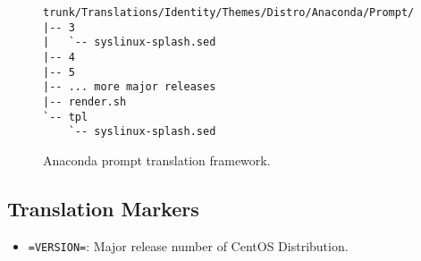 \begin{figure}[!hbp]
\hrulefill
\begin{verbatim}
trunk/Translations/Identity/Themes/Distro/Anaconda/Prompt/
|-- 3
|   `-- syslinux-splash.sed
|-- 4
|-- 5
|-- ... more major releases
|-- render.sh
`-- tpl
    `-- syslinux-splash.sed
\end{verbatim}
\hrulefill
\caption{Anaconda prompt translation framework.%
   \label{fig:Distribution:Anaconda:Prompt:Translations}}
\end{figure}

\subsection{Translation Markers}
\hypertarget{sec:Distribution:Anaconda:Prompt:Translations:Markers}{}
\label{sec:Distribution:Anaconda:Prompt:Translations:Markers}

\begin{itemize}
\item \texttt{=VERSION=}: Major release number of CentOS Distribution.
\end{itemize}

